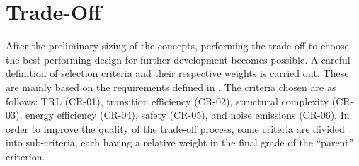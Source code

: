 
\section*{Trade-Off}
After the preliminary sizing of the concepts, performing the trade-off to choose the best-performing design for further development becomes possible. A careful definition of selection criteria and their respective weights is carried out. These are mainly based on the requirements defined in \cite{baselinerepo}.
The criteria chosen are as follows: TRL (CR-01), transition efficiency (CR-02), structural complexity (CR-03), energy efficiency (CR-04), safety (CR-05), and noise emissions (CR-06). In order to improve the quality of the trade-off process, some criteria are divided into sub-criteria, each having a relative weight in the final grade of the \enquote{parent} criterion.


